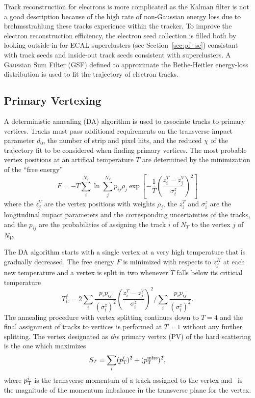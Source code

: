 Track reconstruction for electrons is more complicated as the Kalman filter is not a good description because of the high rate of non-Gaussian energy loss due to brehmsstrahlung these tracks experience within the tracker.
To improve the electron reconstruction efficiency, the electron seed collection is filled both by looking outside-in for ECAL superclusters (see Section~\ref{sec:pf_sc}) consistant with track seeds and inside-out track seeds consistent with superclusters.
A Gaussian Sum Filter (GSF) defined to approximate the Bethe-Heitler energy-loss distribution is used to fit the trajectory of electron tracks. 

\subsection{Primary Vertexing}
\label{sec:pf_pv}


A deterministic annealing (DA) algorithm is used to associate tracks to primary vertices.
Tracks must pass additional requirements on the transverse impact parameter $d_0$, the number of strip and pixel hits, and the reduced $\chi$ of the trajectory fit to be considered when finding primary vertices.
The most probable vertex positions at an artifical temperature $T$ are determined by the minimization of the ``free energy''
\begin{equation}
  F = -T \sum_i^{N_T} \ln \sum_j^{N_V} p_{ij} \rho_j \exp \left[ - \frac{1}{T} \left(\frac{z_i^T - z_j^V}{\sigma^z_i}\right)^2 \right]
\end{equation}
where the $z_j^V$ are the vertex positions with weights $\rho_j$, the $z_i^T$ and $\sigma_i^z$  are the longitudinal impact parameters and the corresponding uncertainties of the tracks, and the $p_{ij}$ are the probabilities of assigning the track $i$ of $N_T$ to the vertex $j$ of $N_V$.

The DA algorithm starts with a single vertex at a very high temperature that is gradually decreased.
The free energy $F$ is minimized with respects to $z_j^K$ at each new temperature and a vertex is split in two whenever $T$ falls below its criticial temperature
\begin{equation}
  T_C^j = 2 \sum_i \frac{p_i p_{ij}}{\left(\sigma_i^z\right)^2} \left(\frac{z_i^T - z_j^V}{\sigma^z_i}\right)^2 \Bigg/ \sum_i \frac{p_i p_{ij}}{\left(\sigma_i^z\right)^2}.
\end{equation}
The annealing procedure with vertex splitting continues down to $T = 4$ and the final assignment of tracks to vertices is performed at $T = 1$ without any further splitting. 
The vertex designated as \textit{the} primary vertex (PV) of the hard scattering is the one which maximizes
\begin{equation}
  S_T = \sum_i  (p_{\mathrm{T}}^i)^2 + (p_{\mathrm{T}}^\text{miss})^2,
  \end{equation}
where $p_{\mathrm{T}}^i$ is the transverse momentum of a track assigned to the vertex and \ptmiss\ is the magnitude of the momentum imbalance in the transverse plane for the vertex. 

